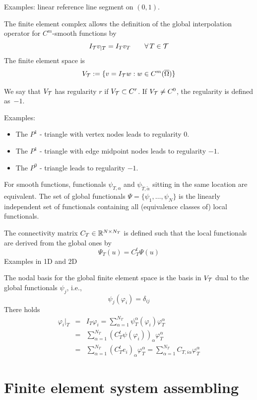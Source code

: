 Examples: linear reference line segment on $(0,1)$.


The finite element complex allows the definition of the global 
interpolation operator for $C^m$-smooth functions by
$$
I_{\cal T} v_{|T} = I_T v_T \qquad \forall \, T \in {\cal T}
$$
%
The finite element space is 
$$
V_{\cal T} := \{ v = I_{\cal T} w : w \in C^m(\overline \Omega) \}
$$

We say that $V_{\cal T}$ has regularity $r$ if $V_{\cal T} \subset C^r$.
If $V_{\cal T} \neq C^0$, the regularity is defined as~$-1$.

Examples:
\begin{itemize}
\item
The $P^1$ - triangle with vertex nodes leads to regularity $0$.
\item
The $P^1$ - triangle with edge midpoint nodes leads to regularity $-1$.
\item
The $P^0$ - triangle leads to regularity $-1$.
\end{itemize}

\medskip

For smooth functions, functionals $\psi_{T,\alpha}$ and $\psi_{\widetilde T, \tilde \alpha}$ sitting in the same location are equivalent. The set of global 
functionals $\Psi  = \{ \psi_1, \ldots, \psi_N\}$ is the linearly independent
set of functionals containing all (equivalence classes of) local functionals.

The connectivity matrix $C_T \in {\mathbb R}^{N \times N_T}$ is defined such
that the local functionals are derived from the global ones by
$$
\Psi_T (u) = C_T^t \Psi (u)
$$
Examples in 1D and 2D


The nodal basis for the global finite element space is the
basis in $V_{\cal T}$ dual to the global functionals $\psi_j$, i.e., 
$$
\psi_j(\varphi_i) = \delta_{ij}
$$
There holds
\begin{eqnarray*}
\varphi_i|_T & = & 
I_T \varphi_i = \sum_{\alpha = 1}^{N_T} \psi_T^\alpha (\varphi_i) \varphi^\alpha_T \\
& = & \sum_{\alpha = 1}^{N_T} (C_T^t \psi(\varphi_i))_\alpha \varphi_T^\alpha \\
& = & \sum_{\alpha = 1}^{N_T} (C_T^t e_i)_\alpha \varphi_T^\alpha = \sum_{\alpha = 1}^{N_T} C_{T,i\alpha} \varphi_T^\alpha 
\end{eqnarray*}


\section{Finite element system assembling}

